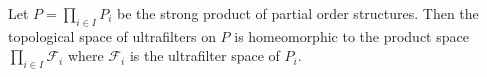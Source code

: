 Let $P = \prod_{i \in I} P_i$ be the strong product of partial order structures. Then the topological space of ultrafilters on $P$ is homeomorphic to the product space $\prod_{i \in I} \mathcal{F}_i$ where $\mathcal{F}_i$ is the ultrafilter space of $P_i$.
